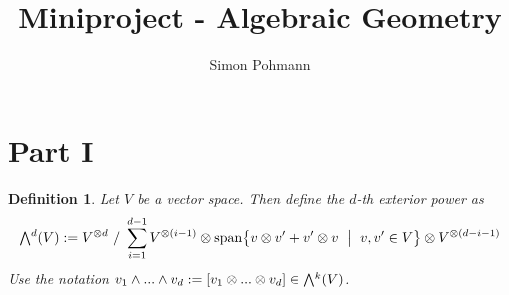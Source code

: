 \documentclass{scrartcl}
\title{Miniproject - Algebraic Geometry}
\author{Simon Pohmann}
\date{}
\newcommand{\extpow}{\mathchoice{{\textstyle\bigwedge}}
    {{\bigwedge}}
    {{\textstyle\wedge}}
    {{\scriptstyle\wedge}}}
\newcommand{\vspan}{\mathrm{span}}
\newtheorem{definition}{Definition}
\begin{document}
\maketitle

\section{Part I}

\begin{definition}
    Let $V$ be a vector space.
    Then define the $d$-th exterior power as
    \begin{equation*}
        \extpow^d(V) := V^{\otimes d} \ / \ \sum_{i = 1}^{d - 1} V^{\otimes (i - 1)} \otimes \vspan\bigl\{ v \otimes v' + v' \otimes v \ \bigm| \ v, v' \in V \bigr\} \otimes V^{\otimes (d - i - 1)}
    \end{equation*}
    Use the notation $v_1 \wedge ... \wedge v_d := [v_1 \otimes ... \otimes v_d] \in \extpow^k(V)$.
\end{definition}
\end{document}
